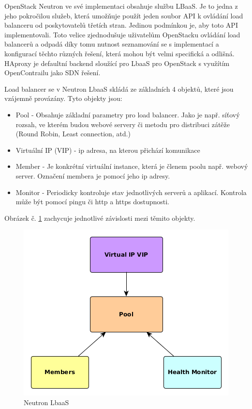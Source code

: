 OpenStack Neutron ve své implementaci obsahuje službu LBaaS. Je to jedna z jeho pokročilou služeb, která umožňuje použít jeden soubor API k ovládání load balanceru od poskytovatelů třetích stran. Jedinou podmínkou je, aby toto API implementovali. Toto velice zjednodušuje uživatelům OpenStacku ovládání load balancerů a odpadá díky tomu nutnost seznamování se s implementací a konfigurací těchto různých řešení, která mohou být velmi specifická a odlišná. HAproxy je defaultní backend sloužící pro LbaaS pro OpenStack s využítím OpenContrailu jako SDN řešení. 

Load balancer se v Neutron LbaaS skládá ze základních 4 objektů, které jsou vzájemně provázány. Tyto objekty jsou:

\begin{itemize}
\item Pool - Obsahuje základní parametry pro load balancer. Jako je např. síťový rozsah, ve kterém budou webové servery či metodu pro distribuci zátěže (Round Robin, Least connection, atd.)
\item Virtuální IP (VIP) - ip adresa, na kterou přichází komunikace
\item Member - Je konkrétní virtuální instance, která je členem poolu např. webový server. Označení membera je pomocí jeho ip adresy.
\item Monitor - Periodicky kontroluje stav jednotlivých serverů a aplikací. Kontrola může být pomocí pingu či http a https dostupnosti.
\end{itemize}

Obrázek č. \ref{fig:NeutronLbaaS} zachycuje jednotlivé závislosti mezi těmito objekty.

\begin{figure}[h]
\begin{centering}
\includegraphics[scale=0.63]{images/NeutronLbaaS}
\par\end{centering}
\caption{Neutron LbaaS\label{fig:NeutronLbaaS}}
\end{figure}

